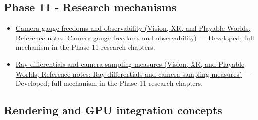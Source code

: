 \subsection{Phase 11 - Research mechanisms}\label{appendix-a6d556a4ef50-phase-11---research-mechanisms}

\begin{itemize}
\tightlist
\item
  \href{../07-Vision-XR-and-Playable-Worlds/main.pdf\#nameddest=appendix-113f0267e5f4}{Camera gauge freedoms and observability (Vision, XR, and Playable Worlds, Reference notes: Camera gauge freedoms and observability)} --- Developed; full mechanism in the Phase 11 research chapters.
\item
  \href{../07-Vision-XR-and-Playable-Worlds/main.pdf\#nameddest=appendix-8c40fad29462}{Ray differentials and camera sampling measures (Vision, XR, and Playable Worlds, Reference notes: Ray differentials and camera sampling measures)} --- Developed; full mechanism in the Phase 11 research chapters.
\end{itemize}

\subsection{Rendering and GPU integration concepts}\label{appendix-a6d556a4ef50-rendering-and-gpu-integration-concepts}

